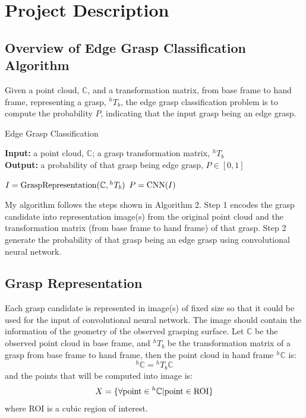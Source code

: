 \documentclass[letterpaper]{article} %
\begin{document}
\section{Project Description}
\subsection{Overview of Edge Grasp Classification Algorithm}
Given a point cloud, $\mathbb{C}$, and a transformation matrix, from base frame to hand frame, representing a grasp, ${^h}T_b$, the edge grasp classification problem is to compute the probability $P$, indicating that the input grasp being an edge grasp.

\begin{algorithm}[H]
\caption{Edge Grasp Classification}
\textbf{Input:} a point cloud, $\mathbb{C}$; a grasp transformation matrix, ${^h}T_b$ \\
\textbf{Output:} a probability of that grasp being edge grasp, $P\in [0, 1]$ \\
\begin{algorithmic}[1]
\STATE $I={\rm GraspRepresentation}(\mathbb{C}, {^h}T_b)$
\STATE $P={\rm CNN}(I)$
\end{algorithmic}
\end{algorithm}

My algorithm follows the steps shown in Algorithm 2.  Step 1 encodes the grasp candidate into representation image(s) from the original point cloud and the transformation matrix (from base frame to hand frame) of that grasp. Step 2 generate the probability of that grasp being an edge grasp using convolutional neural network.

\subsection{Grasp Representation}
Each grasp candidate is represented in image(s) of fixed size so that it could be used for the input of convolutional neural network. The image should contain the information of the geometry of the observed grasping surface. Let $\mathbb{C}$ be the observed point cloud in base frame, and ${}^hT_b$ be the transformation matrix of a grasp from base frame to hand frame, then the point cloud in hand frame ${}^h\mathbb{C}$ is:
\begin{equation}
    {}^h\mathbb{C}={}^hT_b\mathbb{C}
\end{equation}
and the points that will be computed into image is:
\begin{equation}
    X=\{\forall {\rm point}\in {}^h\mathbb{C}|{\rm point}\in {\rm ROI}\}
\end{equation}
where ROI is a cubic region of interest.
\end{document}
